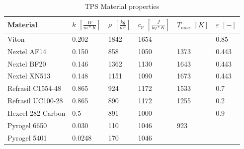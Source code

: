 \begin{table}[H]
	\caption {TPS Material properties}
	\centering
	\begin{tabular}{|l|l|l|l|l|l|}
		\hline
		\textbf{Material}         & \textbf{ $ k $ $ [ \frac{W}{m*K} ] $} & \textbf{ $ \rho $ $ [ \frac{kg}{m^3} ] $} & \textbf{  $ c_{p} $ $ [ \frac{J}{kg*K} ] $ }& \textbf{ $ T_{max} $ $ [ K ] $} &\textbf{ $ \varepsilon $ $ [ - ] $} \\[1.5ex] \hline \hline
		Viton       & 0.202 
		& 1842 & 1654 
		& 	 & 0.85
		\\ \hline
		Nextel AF14       & 0.150                                                 & 858                                        & 1050                                            & 1373	 & 0.443                                      \\ \hline
		Nextel BF20       & 0.146 
		& 1362                                        & 1130 
		& 1643	 & 0.443                                      
		\\ \hline
		Nextel XN513      & 0.148                                                 & 1151                                       & 1090                                            & 1673	 & 0.443                                      \\ \hline
		Refrasil C1554-48 & 0.865                                                 & 924                                        & 1172                                            & 1533	 & 0.7                                        \\ \hline
		Refrasil UC100-28 & 0.865                                                 & 890                                        & 1172                                            & 1255  & 0.2                                        \\ \hline
		Hexcel 282 Carbon & 0.5                                                   & 891                                        & 1000                                            & ~ 	 & 0.9                                        \\ \hline
		Pyrogel 6650      & 0.030                                                 & 110                                        & 1046                                            & 923    & ~                                          \\ \hline
		Pyrogel 5401      & 0.0248                                                & 170                                        & 1046                                            & ~  	 & ~                                          \\ \hline

\end{tabular}
\end{table}
